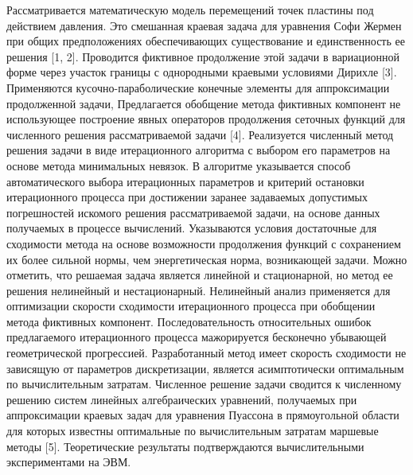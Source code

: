 Рассматривается математическую модель перемещений точек пластины под действием давления. Это смешанная краевая задача для уравнения Софи Жермен при общих предположениях обеспечивающих существование и единственность ее решения [1, 2]. Проводится фиктивное продолжение этой задачи в вариационной форме через участок границы с однородными краевыми условиями Дирихле [3]. Применяются кусочно-параболические конечные элементы для аппроксимации продолженной задачи, Предлагается обобщение метода фиктивных компонент не использующее построение явных операторов продолжения сеточных функций для численного решения рассматриваемой задачи [4]. Реализуется численный метод решения задачи в виде  итерационного алгоритма с выбором его параметров на основе метода минимальных невязок. В алгоритме указывается способ автоматического выбора итерационных параметров и критерий остановки итерационного процесса при достижении заранее задаваемых  допустимых погрешностей искомого решения рассматриваемой задачи, на основе данных получаемых в процессе вычислений. Указываются  условия достаточные для сходимости метода на основе возможности продолжения  функций с сохранением их более сильной нормы, чем энергетическая норма, возникающей задачи. Можно отметить, что решаемая задача является линейной и стационарной, но метод ее решения нелинейный и нестационарный. Нелинейный анализ применяется для оптимизации скорости сходимости итерационного процесса при обобщении метода фиктивных компонент. Последовательность относительных ошибок предлагаемого итерационного процесса мажорируется бесконечно убывающей геометрической прогрессией. Разработанный метод имеет скорость сходимости не зависящую от параметров дискретизации, является асимптотически оптимальным по вычислительным затратам. Численное решение задачи сводится к численному решению систем линейных алгебраических уравнений, получаемых при аппроксимации краевых задач для уравнения Пуассона в прямоугольной области для которых известны оптимальные по вычислительным затратам маршевые методы [5]. Теоретические результаты подтверждаются вычислительными экспериментами на ЭВМ.

